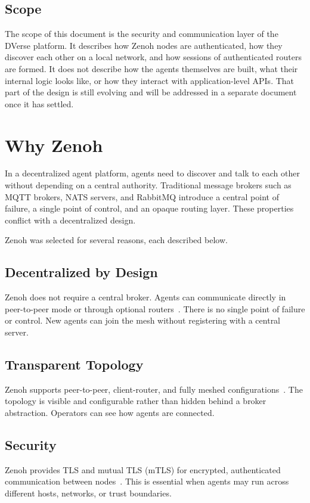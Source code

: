 \documentclass[11pt,a4paper]{article}
\begin{document}
\subsection{Scope}

The scope of this document is the security and communication layer of
the DVerse platform. It describes how Zenoh nodes are authenticated,
how they discover each other on a local network, and how sessions of
authenticated routers are formed. It does not describe how the agents
themselves are built, what their internal logic looks like, or how
they interact with application-level APIs. That part of the design is
still evolving and will be addressed in a separate document once it has settled.

\section{Why Zenoh}

In a decentralized agent platform, agents need to discover and talk
to each other without depending on a central authority. Traditional
message brokers such as MQTT brokers, NATS servers, and RabbitMQ
introduce a central point of failure, a single point of control, and
an opaque routing layer. These properties conflict with a decentralized design.

Zenoh was selected for several reasons, each described below.

\subsection{Decentralized by Design}
Zenoh does not require a central broker. Agents can communicate
directly in peer-to-peer mode or through optional
routers~\citep{zenoh-deployment}. There is no single point of failure
or control. New agents can join the mesh without registering with a
central server.

\subsection{Transparent Topology}
Zenoh supports peer-to-peer, client-router, and fully meshed
configurations~\citep{zenoh-deployment}. The topology is visible and
configurable rather than hidden behind a broker abstraction.
Operators can see how agents are connected.

\subsection{Security}
Zenoh provides TLS and mutual TLS (mTLS) for encrypted, authenticated
communication between nodes~\citep{zenoh-tls}. This is essential when
agents may run across different hosts, networks, or trust boundaries.
\end{document}
